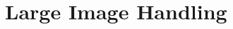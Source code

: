 \documentclass[../Head/Main.tex]{subfiles}
\begin{document}
\section{Large Image Handling}\label{sec:imageHandling}
\end{document}
